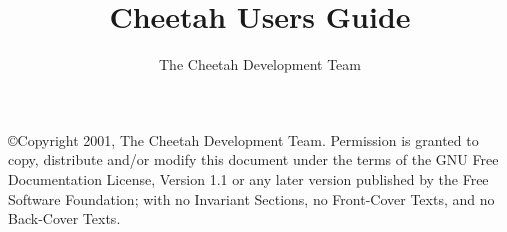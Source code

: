 \documentclass{howto}
\title{Cheetah Users Guide}
\author{The Cheetah Development Team}
\begin{document}
\maketitle


\tableofcontents


\copyright{Copyright 2001, The Cheetah Development Team.
      Permission is granted to copy, distribute and/or modify this document
      under the terms of the GNU Free Documentation License, Version 1.1
      or any later version published by the Free Software Foundation;
      with no Invariant Sections, no Front-Cover Texts, and no Back-Cover Texts.}

    
    
    
    
    
    
    
    

\end{document}
